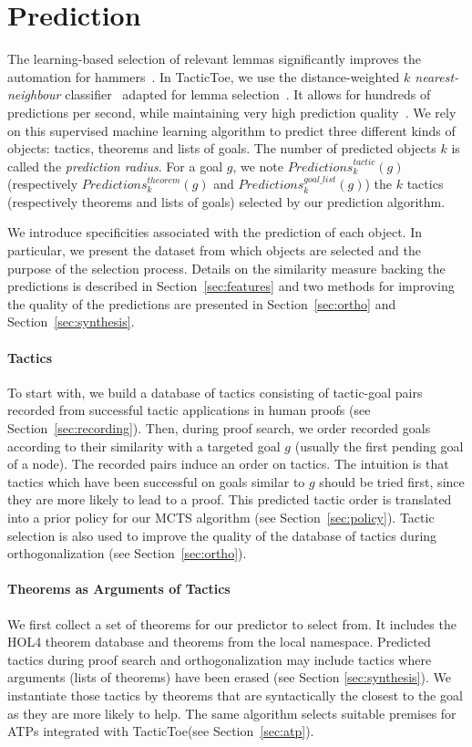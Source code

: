\documentclass[runningheads,a4paper,draft]{svjour3}
\def\holfour{\textsf{HOL4}\xspace}
\def\tactictoe{\textsf{TacticToe}\xspace}
\begin{document}
\section{Prediction}\label{s:prediction}
The learning-based selection of relevant lemmas significantly improves the
automation for hammers~\cite{BlanchetteGKKU16}. In \tactictoe, we use the
distance-weighted \emph{$k$ nearest-neighbour} classifier~\cite{DudaniS76}
adapted for lemma selection~\cite{ckju-pxtp13}. It allows for hundreds of
predictions per second, while maintaining very high prediction quality~\cite{femalecop}.
We rely on this supervised machine learning algorithm to predict three 
different kinds of objects:
 tactics, theorems and lists of goals. The number of predicted objects $k$ is
 called the \emph{prediction radius}. For a goal $g$, we note
$\mathit{Predictions}^{\mathit{tactic}}_k (g)$ (respectively
$\mathit{Predictions}^{\mathit{theorem}}_k (g)$
and $\mathit{Predictions}^{\mathit{goal\_list}}_k (g)$) the $k$ tactics 
(respectively theorems and lists of goals) selected by our prediction algorithm.

We introduce specificities associated with the prediction of each object.
In particular, we present the dataset from which objects are selected and the
purpose of the selection process. Details on the similarity measure backing the 
predictions is described in Section~\ref{sec:features} and two methods for 
improving the quality of the predictions are presented in 
Section~\ref{sec:ortho} and Section~\ref{sec:synthesis}.

\paragraph{Tactics}
To start with, we build a database of tactics consisting
of tactic-goal pairs recorded from successful tactic applications in human
proofs (see
Section~\ref{sec:recording}).
Then, during proof search, we order recorded goals according to their
similarity with a targeted goal $g$ (usually the first pending goal of a node).
The recorded pairs induce an
order on tactics. The intuition is that tactics which have been successful on
goals similar to $g$ should be tried first, since they are more likely to lead
to a proof.
This predicted tactic order is translated into a prior policy for our MCTS
algorithm (see Section~\ref{sec:policy}).
Tactic selection is also used to improve the quality of the database
of tactics during orthogonalization (see Section~\ref{sec:ortho}).

\paragraph{Theorems as Arguments of Tactics}
We first collect a set of theorems for our predictor to select from.
It includes the \holfour theorem database and theorems from the local namespace.
Predicted tactics during proof search and orthogonalization may include
tactics where arguments (lists of theorems) have been erased (see Section
\ref{sec:synthesis}).
We instantiate those tactics by theorems that are syntactically the closest to
the goal as they are more likely to help.
The same algorithm selects suitable premises for ATPs integrated with
\tactictoe (see Section~\ref{sec:atp}).
\end{document}
